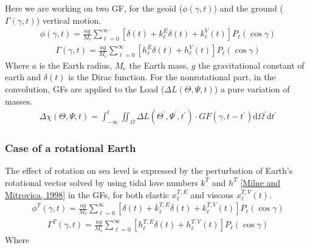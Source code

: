 \documentclass[letterpaper,10pt,english]{sphinxmanual}
\begin{document}
\sphinxAtStartPar
Here we are working on two GF, for the geoïd (\(\phi(\gamma,t)\)) and the ground (\(\Gamma(\gamma,t)\)) vertical motion.
\begin{equation*}
\begin{split}\phi(\gamma, t)=\frac{a g}{M_{\mathrm{e}}} \sum_{\ell=0}^{\infty}\left[\delta(t)+k_{\ell}^E \delta(t)+ k_{\ell}^V(t)\right] P_{\ell}(\cos \gamma)\end{split}
\end{equation*}\begin{equation*}
\begin{split}\Gamma(\gamma, t)=\frac{a g}{M_{\mathrm{e}}} \sum_{\ell=0}^{\infty}\left[h_{\ell}^E \delta(t)+h_{\ell}^V(t)\right] P_{\ell}(\cos \gamma)\end{split}
\end{equation*}
\sphinxAtStartPar
Where \(a\) is the Earth radius, \(M_e\) the Earth mass, \(g\) the gravitational constant of earth and \(\delta(t)\) is the Dirac function. For the non\sphinxhyphen{}rotational part, in the convolution, GFs are applied to the Load (\(\Delta L (\Theta,\Psi,t)\)) a pure variation of masses.
\begin{equation*}
\begin{split}\Delta \chi (\Theta,\Psi,t)=\int_{-\infty}^t \iint_{\Omega} \Delta L\left(\Theta^{\prime}, \Psi^{\prime}, t^{\prime}\right) \cdot G F\left(\gamma, t-t^{\prime}\right) \mathrm{d} \Omega^{\prime} \mathrm{d} t^{\prime}\end{split}
\end{equation*}

\subsubsection{Case of a rotational Earth}
\label{\detokenize{Theory:case-of-a-rotational-earth}}
\sphinxAtStartPar
The effect of rotation on sea level is expressed by the perturbation of Earth’s rotational vector solved by using tidal love numbers \(k^T\) and \(h^T\) {[}\hyperlink{cite.index:id8}{Milne and Mitrovica, 1998}{]} in the GFs, for both elastic \(x_{\ell}^{T,E}\) and viscous \(x_{\ell}^{T,V}(t)\).
\begin{equation*}
\begin{split}\phi^T(\gamma, t)=\frac{a g}{M_{\mathrm{e}}} \sum_{\ell=0}^{\infty}\left[\delta(t)+k_{\ell}^{T,E} \delta(t)+ k_{\ell}^{T,V}(t)\right] P_{\ell}(\cos \gamma)\end{split}
\end{equation*}\begin{equation*}
\begin{split}\Gamma^T(\gamma, t)=\frac{a g}{M_{\mathrm{e}}} \sum_{\ell=0}^{\infty}\left[h_{\ell}^{T,E} \delta(t)+h_{\ell}^{T,V}(t)\right] P_{\ell}(\cos \gamma)\end{split}
\end{equation*}
\sphinxAtStartPar
Where
\end{document}
